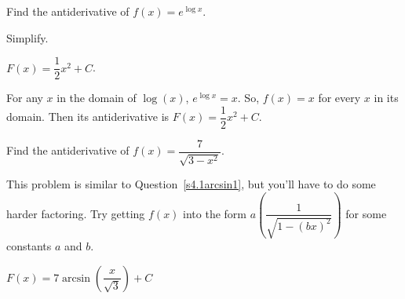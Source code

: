 \begin{question}
Find the  antiderivative of
$f(x)=e^{\log x}$.
\end{question}
\begin{hint}
Simplify.
\end{hint}
\begin{answer}
$F(x)=\dfrac{1}{2}x^2+C$.
\end{answer}
\begin{solution}
For any $x$ in the domain of $\log (x)$, $e^{\log x}=x$. So, $f(x)=x$ for every $x$ in its domain. Then its antiderivative is $F(x)=\dfrac{1}{2}x^2+C$.
\end{solution}


\begin{Mquestion}\label{s4.1ruleslast}
Find the antiderivative of
$f(x)=\dfrac{7}{\sqrt{3-x^2}}$.
\end{Mquestion}
\begin{hint}
This problem is similar to Question~\ref{s4.1arcsin1}, but you'll have to do some harder factoring. Try getting $f(x)$ into the form $a\left(\dfrac{1}{\sqrt{1-(bx)^2}}\right)$ for some constants $a$ and $b$.
\end{hint}
\begin{answer}
$F(x)=7\arcsin\left(\dfrac{x}{\sqrt{3}}\right)+C$
\end{answer}
